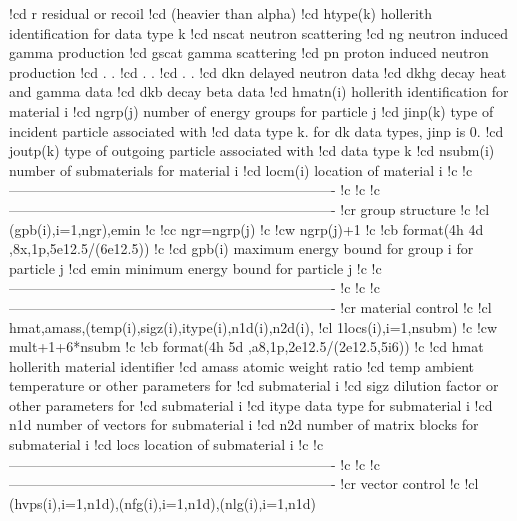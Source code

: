 \begin{ccode}
!cd                     r         residual or recoil
!cd                               (heavier than alpha)
!cd    htype(k)     hollerith identification for data type k
!cd                     nscat     neutron scattering
!cd                     ng        neutron induced gamma production
!cd                     gscat     gamma scattering
!cd                     pn        proton induced neutron production
!cd                       .          .
!cd                       .          .
!cd                       .          .
!cd                     dkn       delayed neutron data
!cd                     dkhg      decay heat and gamma data
!cd                     dkb       decay beta data
!cd    hmatn(i)    hollerith identification for material i
!cd    ngrp(j)      number of energy groups for particle j
!cd    jinp(k)     type of incident particle associated with
!cd                   data type k.  for dk data types, jinp is 0.
!cd    joutp(k)    type of outgoing particle associated with
!cd                   data type k
!cd    nsubm(i)    number of submaterials for material i
!cd    locm(i)     location of material i
!c
!c----------------------------------------------------------------------
!c
!c
!c----------------------------------------------------------------------
!cr          group structure
!c
!cl    (gpb(i),i=1,ngr),emin
!c
!cc    ngr=ngrp(j)
!c
!cw    ngrp(j)+1
!c
!cb    format(4h 4d ,8x,1p,5e12.5/(6e12.5))
!c
!cd    gpb(i)      maximum energy bound for group i for particle j
!cd    emin        minimum energy bound for particle j
!c
!c----------------------------------------------------------------------
!c
!c
!c----------------------------------------------------------------------
!cr          material control
!c
!cl    hmat,amass,(temp(i),sigz(i),itype(i),n1d(i),n2d(i),
!cl   1locs(i),i=1,nsubm)
!c
!cw    mult+1+6*nsubm
!c
!cb    format(4h 5d ,a8,1p,2e12.5/(2e12.5,5i6))
!c
!cd    hmat        hollerith material identifier
!cd    amass       atomic weight ratio
!cd    temp        ambient temperature or other parameters for
!cd                    submaterial i
!cd    sigz        dilution factor or other parameters for
!cd                    submaterial i
!cd    itype       data type for submaterial i
!cd    n1d         number of vectors for submaterial i
!cd    n2d         number of matrix blocks for submaterial i
!cd    locs        location of submaterial i
!c
!c----------------------------------------------------------------------
!c
!c
!c----------------------------------------------------------------------
!cr          vector control
!c
!cl    (hvps(i),i=1,n1d),(nfg(i),i=1,n1d),(nlg(i),i=1,n1d)

\end{ccode}
